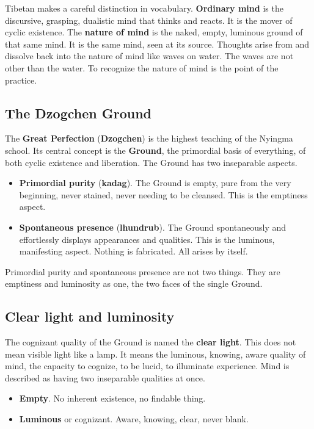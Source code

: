 Tibetan makes a careful distinction in vocabulary. \textbf{Ordinary mind} is the discursive, grasping, dualistic mind that thinks and reacts. It is the mover of cyclic existence. The \textbf{nature of mind} is the naked, empty, luminous ground of that same mind. It is the same mind, seen at its source. Thoughts arise from and dissolve back into the nature of mind like waves on water. The waves are not other than the water. To recognize the nature of mind is the point of the practice.

\subsection*{The Dzogchen Ground}

The \textbf{Great Perfection} (\textbf{Dzogchen}) is the highest teaching of the Nyingma school. Its central concept is the \textbf{Ground}, the primordial basis of everything, of both cyclic existence and liberation. The Ground has two inseparable aspects.

\begin{itemize}
 \item \textbf{Primordial purity} (\textbf{kadag}). The Ground is empty, pure from the very beginning, never stained, never needing to be cleansed. This is the emptiness aspect.
 \item \textbf{Spontaneous presence} (\textbf{lhundrub}). The Ground spontaneously and effortlessly displays appearances and qualities. This is the luminous, manifesting aspect. Nothing is fabricated. All arises by itself.
\end{itemize}

Primordial purity and spontaneous presence are not two things. They are emptiness and luminosity as one, the two faces of the single Ground.

\subsection*{Clear light and luminosity}

The cognizant quality of the Ground is named the \textbf{clear light}. This does not mean visible light like a lamp. It means the luminous, knowing, aware quality of mind, the capacity to cognize, to be lucid, to illuminate experience. Mind is described as having two inseparable qualities at once.

\begin{itemize}
 \item \textbf{Empty}. No inherent existence, no findable thing.
 \item \textbf{Luminous} or cognizant. Aware, knowing, clear, never blank.
\end{itemize}

